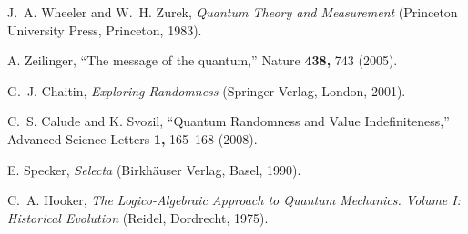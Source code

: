 \documentclass[11pt, pra,amsfonts,showpacs,showkeys]{revtex4}%
\begin{document}
\begin{thebibliography}{10}
J.~A. Wheeler and W.~H. Zurek, {\em Quantum Theory and Measurement} (Princeton
  University Press, Princeton, 1983).

A. Zeilinger, ``The message of the quantum,'' Nature {\bf 438,} 743 (2005).

G.~J. Chaitin, {\em Exploring Randomness} (Springer Verlag, London, 2001).

C.~S. Calude and K. Svozil, ``Quantum Randomness and Value Indefiniteness,''
  Advanced Science Letters {\bf 1,} 165--168 (2008).

E. Specker, {\em Selecta} (Birkh{\"{a}}user Verlag, Basel, 1990).

C.~A. Hooker, {\em The Logico-Algebraic Approach to Quantum Mechanics. {V}olume
  {I}: Historical Evolution} (Reidel, Dordrecht, 1975).

\end{thebibliography}
\end{document}
